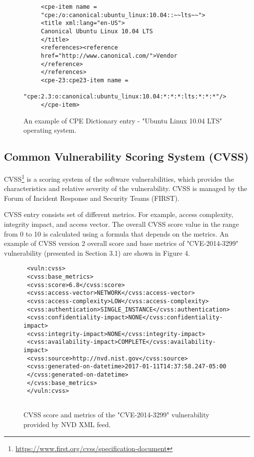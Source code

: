 \documentclass{llncs}
\begin{document}
  \begin{figure}
   
     \lstset{language=XML}
      \begin{lstlisting}
     <cpe-item name =
     "cpe:/o:canonical:ubuntu_linux:10.04::~~lts~~">
     <title xml:lang="en-US">
     Canonical Ubuntu Linux 10.04 LTS
     </title>
     <references><reference 
     href="http://www.canonical.com/">Vendor
     </reference>
     </references>
     <cpe-23:cpe23-item name =
    "cpe:2.3:o:canonical:ubuntu_linux:10.04:*:*:*:lts:*:*:*"/>
     </cpe-item>
      \end{lstlisting}
     \caption{An example of CPE Dictionary entry - "Ubuntu Linux 10.04 LTS" operating system.}
      \end{figure}
  
  
 \subsection{Common Vulnerability Scoring System (CVSS)}
 
 \par CVSS\footnote{\url{https://www.first.org/cvss/specification-document}} is a scoring system of the software  vulnerabilities, which provides the characteristics and relative severity of the vulnerability. CVSS is managed by the Forum of Incident Response and Security Teams (FIRST).
 
 \par CVSS entry consists set of different metrics. For example, access complexity, integrity impact, and access vector. The overall CVSS score value in the range from 0 to 10  is calculated using a formula that depends on the metrics. An example of CVSS version 2 overall score and  base metrics of "CVE-2014-3299" vulnerability (presented in Section 3.1) are shown in Figure 4.
 
 \begin{figure}
    \centering
      \lstset{language=XML}
       \begin{lstlisting}
 <vuln:cvss>
 <cvss:base_metrics>
 <cvss:score>6.8</cvss:score>
 <cvss:access-vector>NETWORK</cvss:access-vector>
 <cvss:access-complexity>LOW</cvss:access-complexity>
 <cvss:authentication>SINGLE_INSTANCE</cvss:authentication>
 <cvss:confidentiality-impact>NONE</cvss:confidentiality-impact>
 <cvss:integrity-impact>NONE</cvss:integrity-impact>
 <cvss:availability-impact>COMPLETE</cvss:availability-impact>
 <cvss:source>http://nvd.nist.gov</cvss:source>
 <cvss:generated-on-datetime>2017-01-11T14:37:58.247-05:00
 </cvss:generated-on-datetime>
 </cvss:base_metrics>
 </vuln:cvss>
 
       \end{lstlisting}
      \caption{CVSS score and metrics of the "CVE-2014-3299" vulnerability provided by NVD XML feed.}
       \end{figure}
\end{document}
